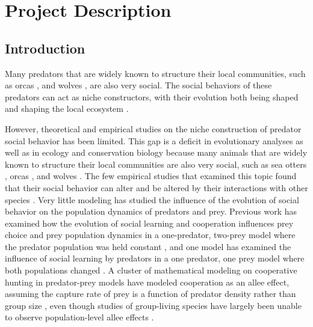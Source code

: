 
\section{Project Description}
\subsection{Introduction}

Many predators that are widely known to structure their local communities, such as orcas \cite{estes_killer_1998, valls_keystone_2015}, and wolves \cite{c_eisenberg_wolfs_2013}, are also very social. The social behaviors of these predators can act as niche constructors, with their evolution both being shaped and shaping the local ecosystem \cite{odling-smee_niche_1996}. 

However, theoretical and empirical studies on the niche construction of predator social behavior has been limited. This gap is a deficit in evolutionary analyses as well as in ecology and conservation biology because many animals that are widely known to structure their local communities are also very social, such as sea otters  \cite{estes_killer_1998, estes_sea_2016}, orcas \cite{estes_killer_1998, valls_keystone_2015}, and wolves \cite{c_eisenberg_wolfs_2013}. The few empirical studies that examined this topic found that their social behavior can alter and be altered by their interactions with other species \cite{jordaan_effect_2023, imbert_why_2016, foster_social_2012, zimmermann_predatordependent_2015}. Very little modeling has studied the influence of the evolution of social behavior on the population dynamics of predators and prey. Previous work has examined how the evolution of social learning and cooperation influences prey choice and prey population dynamics in a one-predator, two-prey model where the predator population was held constant \cite{borofsky_static_2022, borofsky_success-biased_2022, borofsky_cultural_2024}, and one model has examined the influence of social learning by predators in a one predator, one prey model where both populations changed \cite{kikuchi_social_2023}. A cluster of mathematical modeling on cooperative hunting in predator-prey models have modeled cooperation as an allee effect, assuming the capture rate of prey is a function of predator density rather than group size \citep[e.g.][]{berec_impacts_2010, teixeira_alves_hunting_2017}, even though studies of group-living species have largely been unable to observe population-level allee effects \cite{lerch_why_2018}. 

